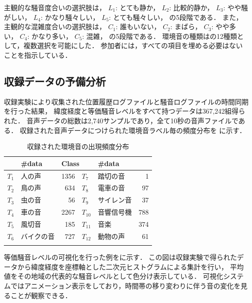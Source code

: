 \documentclass[autodetect-engine,dvi=dvipdfmx,ja=standard,
               a4,twoside,10pt]{bxjsarticle}
\begin{document}
主観的な騒音度合いの選択肢は，
$L_1$: とても静か，
$L_2$: 比較的静か，
$L_3$: やや騒がしい，
$L_4$: かなり騒々しい，
$L_5$: とても騒々しい，
の5段階である．
また，主観的な混雑度合いの選択肢は，
$C_1$: 誰もいない，
$C_2$: まばら，
$C_3$: やや多い，
$C_4$: かなり多い，
$C_5$: 混雑，
の5段階である．
環境音の種類はの12種類として，複数選択を可能にした．
参加者には，すべての項目を埋める必要はないことを指示している．

\subsection{収録データの予備分析}

収録実験により収集された位置履歴ログファイルと騒音ログファイルの時間同期を行った結果，
緯度経度と等価騒音レベルをすべて持つデータは367,242組得られた．
音声データの総数は2,740サンプルであり，全て10秒の音声ファイルである．
収録された音声データにつけられた環境音ラベル毎の頻度分布を
に示す．

\begin{table}[tb]
\centering
	\caption{収録された環境音の出現頻度分布}
	\label{tbl:SoundTypeHistogram}
	\begin{tabular}{llr|llr}
	\Hline
	\multicolumn{2}{l}{Class} & \#data & \multicolumn{2}{l}{Class} & \#data \\
	\hline
	$T_1$ &	人の声      & 1356 & $T_{7}$  & 踏切の音   &   1 \\
	$T_2$ &	鳥の声      &  634 & $T_{8}$  & 電車の音   &  97 \\
	$T_3$ &	虫の音      &   56 & $T_{9}$  & サイレン音 &  37 \\
	$T_4$ &	車の音      & 2267 & $T_{10}$ & 音響信号機 & 788 \\
	$T_5$ &	風切音      &  185 & $T_{11}$ & 音楽     &   374 \\
	$T_6$ & バイクの音  &  727 & $T_{12}$ & 動物の声 &    61 \\
	\Hline
	\end{tabular}
\end{table}

等価騒音レベルの可視化を行った例をに示す．
この図は収録実験で得られたデータから緯度経度を座標軸とした二次元ヒストグラムによる集計を行い，
平均値をその地域の代表的な騒音レベルとして色分け表示している．
可視化システムではアニメーション表示をしており，時間帯の移り変わりに伴う音の変化を見ることが観察できる．
\end{document}

